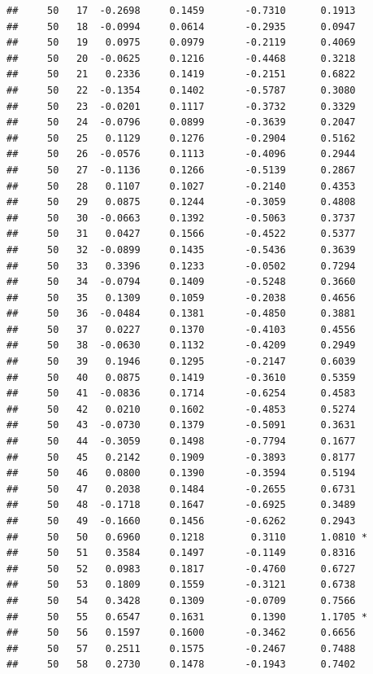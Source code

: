 \documentclass[
]{article}
\begin{document}
\begin{verbatim}
##     50   17  -0.2698     0.1459       -0.7310      0.1913  
##     50   18  -0.0994     0.0614       -0.2935      0.0947  
##     50   19   0.0975     0.0979       -0.2119      0.4069  
##     50   20  -0.0625     0.1216       -0.4468      0.3218  
##     50   21   0.2336     0.1419       -0.2151      0.6822  
##     50   22  -0.1354     0.1402       -0.5787      0.3080  
##     50   23  -0.0201     0.1117       -0.3732      0.3329  
##     50   24  -0.0796     0.0899       -0.3639      0.2047  
##     50   25   0.1129     0.1276       -0.2904      0.5162  
##     50   26  -0.0576     0.1113       -0.4096      0.2944  
##     50   27  -0.1136     0.1266       -0.5139      0.2867  
##     50   28   0.1107     0.1027       -0.2140      0.4353  
##     50   29   0.0875     0.1244       -0.3059      0.4808  
##     50   30  -0.0663     0.1392       -0.5063      0.3737  
##     50   31   0.0427     0.1566       -0.4522      0.5377  
##     50   32  -0.0899     0.1435       -0.5436      0.3639  
##     50   33   0.3396     0.1233       -0.0502      0.7294  
##     50   34  -0.0794     0.1409       -0.5248      0.3660  
##     50   35   0.1309     0.1059       -0.2038      0.4656  
##     50   36  -0.0484     0.1381       -0.4850      0.3881  
##     50   37   0.0227     0.1370       -0.4103      0.4556  
##     50   38  -0.0630     0.1132       -0.4209      0.2949  
##     50   39   0.1946     0.1295       -0.2147      0.6039  
##     50   40   0.0875     0.1419       -0.3610      0.5359  
##     50   41  -0.0836     0.1714       -0.6254      0.4583  
##     50   42   0.0210     0.1602       -0.4853      0.5274  
##     50   43  -0.0730     0.1379       -0.5091      0.3631  
##     50   44  -0.3059     0.1498       -0.7794      0.1677  
##     50   45   0.2142     0.1909       -0.3893      0.8177  
##     50   46   0.0800     0.1390       -0.3594      0.5194  
##     50   47   0.2038     0.1484       -0.2655      0.6731  
##     50   48  -0.1718     0.1647       -0.6925      0.3489  
##     50   49  -0.1660     0.1456       -0.6262      0.2943  
##     50   50   0.6960     0.1218        0.3110      1.0810 *
##     50   51   0.3584     0.1497       -0.1149      0.8316  
##     50   52   0.0983     0.1817       -0.4760      0.6727  
##     50   53   0.1809     0.1559       -0.3121      0.6738  
##     50   54   0.3428     0.1309       -0.0709      0.7566  
##     50   55   0.6547     0.1631        0.1390      1.1705 *
##     50   56   0.1597     0.1600       -0.3462      0.6656  
##     50   57   0.2511     0.1575       -0.2467      0.7488  
##     50   58   0.2730     0.1478       -0.1943      0.7402  

\end{verbatim}
\end{document}
